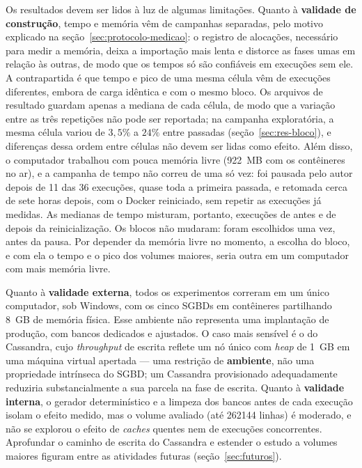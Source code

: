 Os resultados devem ser lidos à luz de algumas limitações. Quanto à \textbf{validade de
construção}, tempo e memória vêm de campanhas separadas, pelo motivo explicado na
seção~\ref{sec:protocolo-medicao}: o registro de alocações, necessário para medir a memória,
deixa a importação mais lenta e distorce as fases umas em relação às outras, de modo que os
tempos só são confiáveis em execuções sem ele. A contrapartida é que tempo e pico de uma
mesma célula vêm de execuções diferentes, embora de carga idêntica e com o mesmo bloco. Os
arquivos de resultado guardam apenas a mediana de cada célula, de modo que a variação entre
as três repetições não pode ser reportada; na campanha exploratória, a mesma célula variou
de $3{,}5\%$ a $24\%$ entre passadas (seção~\ref{sec:res-bloco}), e diferenças dessa ordem
entre células não devem ser lidas como efeito. Além disso, o computador trabalhou com pouca
memória livre (922~MB com os contêineres no ar), e a campanha de tempo não correu de uma só
vez: foi pausada pelo autor depois de 11 das 36 execuções, quase toda a primeira passada, e
retomada cerca de sete horas depois, com o Docker reiniciado, sem repetir as execuções já
medidas. As medianas de tempo misturam, portanto, execuções de antes e de depois da
reinicialização. Os blocos não mudaram: foram escolhidos uma vez, antes da pausa. Por
depender da memória livre no momento, a escolha do bloco, e com ela o tempo e o pico dos
volumes maiores, seria outra em um computador com mais memória livre.

Quanto à \textbf{validade externa}, todos os experimentos correram em um único computador,
sob Windows, com os cinco SGBDs em contêineres partilhando 8~GB de memória física. Esse
ambiente não representa uma implantação de produção, com bancos dedicados e ajustados. O
caso mais sensível é o do Cassandra, cujo \textit{throughput} de escrita reflete um nó único
com \textit{heap} de 1~GB em uma máquina virtual apertada --- uma restrição de
\textbf{ambiente}, não uma propriedade intrínseca do SGBD; um Cassandra provisionado
adequadamente reduziria substancialmente a sua parcela na fase de escrita. Quanto à
\textbf{validade interna}, o gerador determinístico e a limpeza dos bancos antes de cada
execução isolam o efeito medido, mas o volume avaliado (até \num{262144} linhas) é moderado,
e não se explorou o efeito de \textit{caches} quentes nem de execuções concorrentes.
Aprofundar o caminho de escrita do Cassandra e estender o estudo a volumes maiores figuram
entre as atividades futuras (seção~\ref{sec:futuros}).

